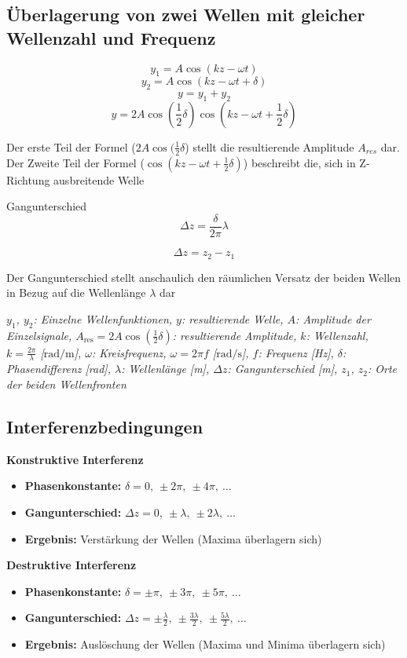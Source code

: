 \documentclass[a4paper,10pt]{article}
\newenvironment{displayformula}
{
	\begin{framed}
		\color{formulaColor}
	}
	{\end{framed}}
\newcommand{\formulalegend}[1]{%
	\par\vspace{0.5ex}%
	{{\color{legendColor}\RaggedRight\small\textit{#1}}}%
	\par\vspace{1.5ex}%
}
\begin{document}
\subsection{Überlagerung von zwei Wellen mit gleicher Wellenzahl und Frequenz}
\begin{displayformula}
\[
y_1 = A \cos (kz - \omega t)
\]
\[
y_2 = A \cos (kz - \omega t + \delta)
\]
\[
y = y_1 + y_2
\]
\[
y = 2 A \cos (\frac{1}{2} \delta) \cos (kz - \omega t + \frac{1}{2} \delta)
\]
\end{displayformula}
Der erste Teil der Formel ($2A \cos (\frac{1}{2} \delta$) stellt die resultierende Amplitude $A_{res}$ dar. \\
Der Zweite Teil der Formel ($\cos (kz - \omega t + \frac{1}{2} \delta)$) beschreibt die, sich in Z-Richtung ausbreitende Welle

\begin{displayformula}
	Gangunterschied
	\[
	\Delta z = \frac{\delta}{2 \pi} \lambda
	\]
	
	\[
	\Delta z = z_2 - z_1
	\]
\end{displayformula}
Der Gangunterschied stellt anschaulich den räumlichen Versatz der beiden Wellen in Bezug auf die Wellenlänge $\lambda$ dar
\formulalegend{
	$y_1$, $y_2$: Einzelne Wellenfunktionen, 
	$y$: resultierende Welle, 
	$A$: Amplitude der Einzelsignale, 
	$A_{\text{res}} = 2A \cos(\frac{1}{2}\delta)$: resultierende Amplitude, 
	$k$: Wellenzahl, $k = \frac{2\pi}{\lambda}$ [$\text{rad}/\text{m}$], 
	$\omega$: Kreisfrequenz, $\omega = 2\pi f$ [$\text{rad}/\text{s}$], 
	$f$: Frequenz [Hz], 
	$\delta$: Phasendifferenz [rad], 
	$\lambda$: Wellenlänge [m], 
	$\Delta z$: Gangunterschied [m], 
	$z_1$, $z_2$: Orte der beiden Wellenfronten
}



\subsection{Interferenzbedingungen}

\textbf{Konstruktive Interferenz}

\begin{itemize}
	\item \textbf{Phasenkonstante:} $\delta = 0,\ \pm 2\pi,\ \pm 4\pi,\ \dots$
	\item \textbf{Gangunterschied:} $\Delta z = 0,\ \pm \lambda,\ \pm 2\lambda,\ \dots$
	\item \textbf{Ergebnis:} Verstärkung der Wellen (Maxima überlagern sich)
\end{itemize}

\vspace{1ex}

\textbf{Destruktive Interferenz}

\begin{itemize}
	\item \textbf{Phasenkonstante:} $\delta = \pm \pi,\ \pm 3\pi,\ \pm 5\pi,\ \dots$
	\item \textbf{Gangunterschied:} $\Delta z = \pm \frac{\lambda}{2},\ \pm \frac{3\lambda}{2},\ \pm \frac{5\lambda}{2},\ \dots$
	\item \textbf{Ergebnis:} Auslöschung der Wellen (Maxima und Minima überlagern sich)
\end{itemize}
\end{document}
